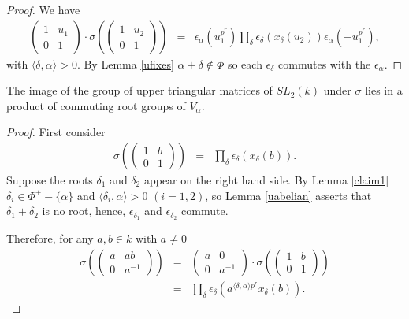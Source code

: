 \begin{proof}
We have
\begin{eqnarray*}
\left(\begin{matrix}1 & u_1 \\ 0 & 1 \end{matrix}\right)
\cdot
\sigma\left(\left(\begin{matrix} 1 & u_2 \\ 0 & 1\end{matrix}\right)\right)
&=&
\epsilon_\alpha(u_1^{p^r}) \prod_\delta \epsilon_\delta\left(x_\delta\left(u_2\right)\right) \epsilon_\alpha(-u_1^{p^r}),
\end{eqnarray*}
with $\langle \delta, \alpha \rangle > 0$. By Lemma \ref{ufixes} $\alpha + \delta \notin \Phi$ so each $\epsilon_\delta$ commutes with the $\epsilon_\alpha$.
\end{proof}

\begin{corollary} The image of the group of upper triangular matrices of $SL_2(k)$ under $\sigma$ lies in a product of commuting root groups of $V_\alpha$.
\end{corollary}
\begin{proof}
First consider
\begin{eqnarray*}
\sigma\left(\left( \begin{matrix} 1 & b \\ 0 & 1 \end{matrix}\right)\right) &=& \prod_\delta \epsilon_\delta\left(x_\delta(b)\right).
\end{eqnarray*}
Suppose the roots $\delta_1$ and $\delta_2$ appear on the right hand side. By Lemma \ref{claim1} $\delta_i \in \Phi^+ - \{\alpha\}$ and $\langle \delta_i, \alpha \rangle > 0$ $(i=1,2)$, so Lemma \ref{uabelian} asserts that $\delta_1 + \delta_2$ is no root, hence, $\epsilon_{\delta_1}$ and $\epsilon_{\delta_2}$ commute. 

Therefore, for any $a, b\in k$ with $a\neq 0$
\begin{eqnarray*}
\sigma\left(\left(\begin{matrix} a & ab \\ 0 & a^{-1}\end{matrix}\right)\right) 
&=& \left(\begin{matrix} a & 0 \\ 0 & a^{-1}\end{matrix} \right) \cdot
\sigma\left(\left(\begin{matrix} 1 & b \\ 0 & 1\end{matrix}\right)\right) \\
&=& \prod_\delta \epsilon_\delta\left(a^{\langle \delta, \alpha \rangle p^r}x_\delta\left(b\right)\right).
\end{eqnarray*}
\end{proof}


